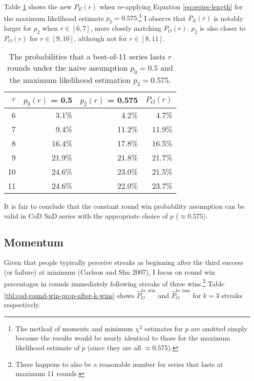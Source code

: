 \documentclass{article}
\begin{document}
Table \ref{tbl:expected-series-lengths-alternative-ps} shows the new
\(P_E(r)\) when re-applying Equation \ref{eq:series-length} for the
maximum likelihood estimate \(p_2 = 0.575\).\footnote{The method of
  moments and minimum \(\chi^2\) estimates for \(p\) are omitted simply
  because the results would be nearly identical to those for the maximum
  likelihood estimate of \(p\) (since they are all \(\approx 0.575\)).}
I observe that \(P_E(r)\) is notably larger for \(p_{2}\) when
\(r \in [6, 7]\), more closely matching \(P_O(r)\). \(p_{2}\) is also
closer to \(P_O(r)\) for \(r \in [9, 10]\), although not for
\(r \in [8, 11]\).

\begin{longtable}[]{@{}rrrr@{}}
\caption{The probabilities that a best-of-11 series lasts $r$ rounds under the naive assumption $p_0 = 0.5$ and the maximum likelihood estimation $p_2 = 0.575$.}\label{tbl:expected-series-lengths-alternative-ps} \\
\toprule()
$r$ & $p_0(r)$ = 0.5 & $p_2(r)$ = 0.575 & $P_O(r)$ \\
\midrule()
\endhead
6 & 3.1\% & 4.2\% & 4.7\% \\
7 & 9.4\% & 11.2\% & 11.9\% \\
8 & 16.4\% & 17.8\% & 16.5\% \\
9 & 21.9\% & 21.8\% & 21.7\% \\
10 & 24.6\% & 23.0\% & 21.5\% \\
11 & 24.6\% & 22.0\% & 23.7\% \\
\bottomrule()
\end{longtable}

It is fair to conclude that the constant round win probability
assumption can be valid in CoD SnD series with the appropriate choice of
\(p\) (\(\approx 0.575\)).

\hypertarget{sec:results-momentum}{%
\subsection{Momentum}\label{sec:results-momentum}}

Given that people typically perceive streaks as beginning after the
third success (or failure) at minimum (Carlson and Shu 2007), I focus on
round win percentages in rounds immediately following streaks of three
wins.\footnote{Three happens to also be a reasonable number for series
  that lasts at maximum 11 rounds.} Table
\ref{tbl:cod-round-win-prop-after-k-wins} shows
\(\hat{P}^{kr,\text{win}}_O\) and \(\hat{P}^{kr,\text{loss}}_O\) for
\(k = 3\) streaks respectively.
\end{document}
